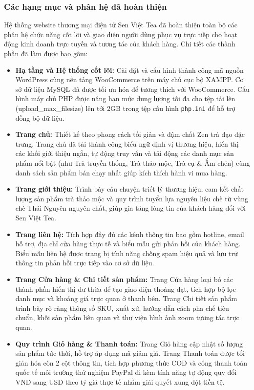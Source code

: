 \subsubsection{Các hạng mục và phân hệ đã hoàn thiện}

Hệ thống website thương mại điện tử Sen Việt Tea đã hoàn thiện toàn bộ các phân hệ chức năng cốt lõi và giao diện người dùng phục vụ trực tiếp cho hoạt động kinh doanh trực tuyến và tương tác của khách hàng. Chi tiết các thành phần đã làm được bao gồm:

\begin{itemize}
    \item \textbf{Hạ tầng và Hệ thống cốt lõi:} Cài đặt và cấu hình thành công mã nguồn WordPress cùng nền tảng WooCommerce trên máy chủ cục bộ XAMPP. Cơ sở dữ liệu MySQL đã được tối ưu hóa để tương thích với WooCommerce. Cấu hình máy chủ PHP được nâng hạn mức dung lượng tối đa cho tệp tải lên (upload\_max\_filesize) lên tới 2GB trong tệp cấu hình \texttt{php.ini} để hỗ trợ đồng bộ dữ liệu.
    \item \textbf{Trang chủ:} Thiết kế theo phong cách tối giản và đậm chất Zen trà đạo đặc trưng. Trang chủ đã tải thành công biểu ngữ định vị thương hiệu, hiển thị các khối giới thiệu ngắn, tự động truy vấn và tải động các danh mục sản phẩm nổi bật (như Trà truyền thống, Trà thảo mộc, Trà cụ \& Ấm chén) cùng danh sách sản phẩm bán chạy nhất giúp kích thích hành vi mua hàng.
    \item \textbf{Trang giới thiệu:} Trình bày câu chuyện triết lý thương hiệu, cam kết chất lượng sản phẩm trà thảo mộc và quy trình tuyển lựa nguyên liệu chè từ vùng chè Thái Nguyên nguyên chất, giúp gia tăng lòng tin của khách hàng đối với Sen Việt Tea.
    \item \textbf{Trang liên hệ:} Tích hợp đầy đủ các kênh thông tin bao gồm hotline, email hỗ trợ, địa chỉ cửa hàng thực tế và biểu mẫu gửi phản hồi của khách hàng. Biểu mẫu liên hệ được trang bị tính năng chống spam hiệu quả và lưu trữ thông tin phản hồi trực tiếp vào cơ sở dữ liệu.
    \item \textbf{Trang Cửa hàng \& Chi tiết sản phẩm:} Trang Cửa hàng loại bỏ các thành phần hiển thị dư thừa để tạo giao diện thoáng đạt, tích hợp bộ lọc danh mục và khoảng giá trực quan ở thanh bên. Trang Chi tiết sản phẩm trình bày rõ ràng thông số SKU, xuất xứ, hướng dẫn cách pha chế tiêu chuẩn, khối sản phẩm liên quan và thư viện hình ảnh zoom tương tác trực quan.
    \item \textbf{Quy trình Giỏ hàng \& Thanh toán:} Trang Giỏ hàng cập nhật số lượng sản phẩm tức thời, hỗ trợ áp dụng mã giảm giá. Trang Thanh toán được tối giản hóa còn 2 cột thông tin, tích hợp phương thức COD và cổng thanh toán quốc tế môi trường thử nghiệm PayPal đi kèm tính năng tự động quy đổi VND sang USD theo tỷ giá thực tế nhằm giải quyết xung đột tiền tệ.

\end{itemize}
